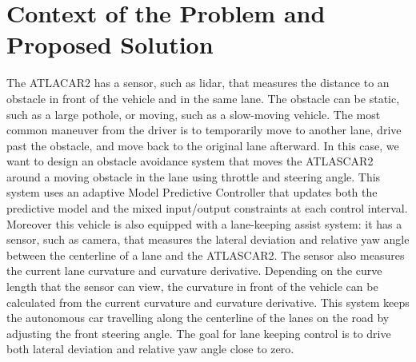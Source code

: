 \documentclass[conference, 11pt]{IEEEtran}
\begin{document}
\section{Context of the Problem and \\  Proposed Solution}
The ATLACAR2 has a sensor, such as lidar, that measures the distance to an obstacle in front of the vehicle and in the same lane. The obstacle can be static, such as a large pothole, or moving, such as a slow-moving vehicle. The most common maneuver from the driver is to temporarily move to another lane, drive past the obstacle, and move back to the original lane afterward.
In this case, we want to design an obstacle avoidance system that moves the ATLASCAR2 around a moving obstacle in the lane using throttle and steering angle. This system uses an adaptive Model Predictive Controller that updates both the predictive model and the mixed input/output constraints at each control interval. Moreover this vehicle is also 
equipped with a lane-keeping assist system: it has a sensor, such as camera, that measures the lateral deviation and relative yaw angle between the centerline of a lane and the ATLASCAR2. The sensor also measures the current lane curvature and curvature derivative. Depending on the curve length that the sensor can view, the curvature in front of the vehicle can be calculated from the current curvature and curvature derivative. This system keeps the autonomous car travelling along the centerline of the lanes on the road by adjusting the front steering angle. The goal for lane keeping control is to drive both lateral deviation and relative yaw angle close to zero.
\end{document}
